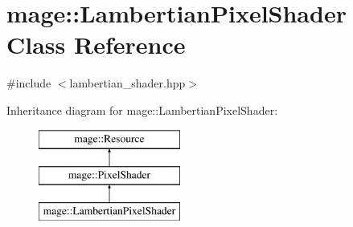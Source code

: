 \hypertarget{classmage_1_1_lambertian_pixel_shader}{}\section{mage\+:\+:Lambertian\+Pixel\+Shader Class Reference}
\label{classmage_1_1_lambertian_pixel_shader}


{\ttfamily \#include $<$lambertian\+\_\+shader.\+hpp$>$}

Inheritance diagram for mage\+:\+:Lambertian\+Pixel\+Shader\+:\begin{figure}[H]
\begin{center}
\leavevmode
\includegraphics[height=3.000000cm]{classmage_1_1_lambertian_pixel_shader}
\end{center}
\end{figure}
